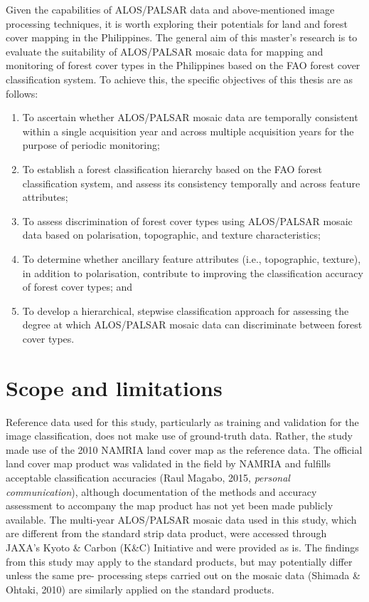 Given the capabilities of ALOS/PALSAR data and above-mentioned image processing techniques, it is worth exploring their potentials for land and forest cover mapping in the Philippines. The general aim of this master’s research is to evaluate the suitability of ALOS/PALSAR mosaic data for mapping and monitoring of forest cover types in the Philippines based on the FAO forest cover classification system. To achieve this, the specific objectives of this thesis are as follows:

\begin{enumerate}
	\item To ascertain whether ALOS/PALSAR mosaic data are temporally consistent within a single acquisition year and across multiple acquisition years for the purpose of periodic monitoring;
	\item To establish a forest classification hierarchy based on the FAO forest classification system, and assess its consistency temporally and across feature attributes;
	\item To assess discrimination of forest cover types using ALOS/PALSAR mosaic data based on polarisation, topographic, and texture characteristics;
	\item To determine whether ancillary feature attributes (i.e., topographic, texture), in addition to polarisation, contribute to improving the classification accuracy of forest cover types; and
	\item To develop a hierarchical, stepwise classification approach for assessing the degree at which ALOS/PALSAR mosaic data can discriminate between forest cover types.
\end{enumerate}

\section{Scope and limitations}
\label{sec: litrev-scope-limitations}

Reference data used for this study, particularly as training and validation for the image classification, does not make use of ground-truth data. Rather, the study made use of the 2010 NAMRIA land cover map as the reference data. The official land cover map product was validated in the field by NAMRIA and fulfills acceptable classification accuracies (Raul Magabo, 2015, \textit{personal communication}), although documentation of the methods and accuracy assessment to accompany the map product has not yet been made publicly available. The multi-year ALOS/PALSAR mosaic data used in this study, which are different from the standard strip data product, were accessed through JAXA's Kyoto \& Carbon (K\&C) Initiative and were provided as is. The findings from this study may apply to the standard products, but may potentially differ unless the same pre- processing steps carried out on the mosaic data (Shimada \& Ohtaki, 2010) are similarly applied on the standard products.
